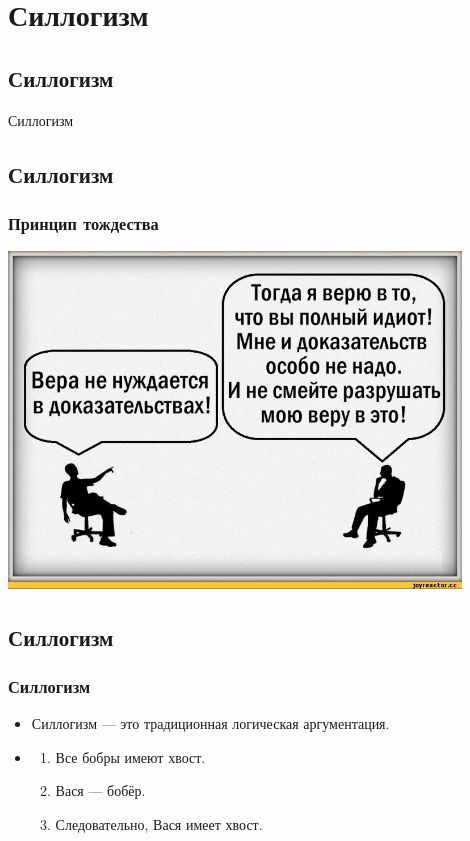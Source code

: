 \documentclass[compress,red]{beamer}
\begin{document}
\section{Силлогизм}
\subsection{Силлогизм}
\begin{frame}
  \begin{center}
    \Huge{Силлогизм}
  \end{center}
\end{frame}

\subsection{Силлогизм}
\begin{frame}[fragile]
  \frametitle{Принцип тождества}
  \centerline{\includegraphics[width=0.9\textwidth]{images/proof_or_fail.jpeg}}
\end{frame}

\subsection{Силлогизм}
\begin{frame}[fragile]
  \frametitle{Силлогизм}
  \begin{itemize}
    \item Силлогизм --- это традиционная логическая аргументация.
    \item 
      \begin{enumerate}
        \item Все бобры имеют хвост. 
        \item Вася --- бобёр. 
        \item Следовательно, Вася имеет хвост.
      \end{enumerate}
  \end{itemize}
\end{frame}
\end{document}
